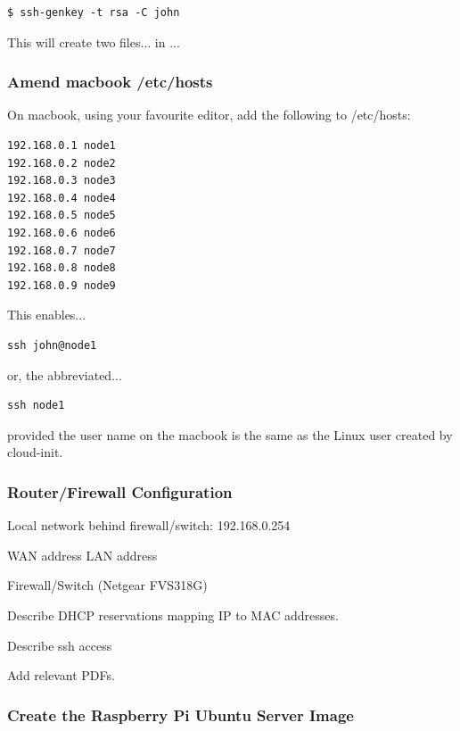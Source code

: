 \documentclass{article}
\begin{document}
\begin{lstlisting}[]
$ ssh-genkey -t rsa -C john
\end{lstlisting}

This will create two files... in ...



\subsubsection{Amend macbook /etc/hosts}

On macbook, using your favourite editor, add the following to /etc/hosts:

\begin{lstlisting}[]
192.168.0.1 node1
192.168.0.2 node2
192.168.0.3 node3
192.168.0.4 node4
192.168.0.5 node5
192.168.0.6 node6
192.168.0.7 node7
192.168.0.8 node8
192.168.0.9 node9
\end{lstlisting}

This enables...

\begin{lstlisting}[]
ssh john@node1
\end{lstlisting}

or, the abbreviated...

\begin{lstlisting}[]
ssh node1
\end{lstlisting}

provided the user name on the macbook is the same as the Linux user created by cloud-init.



\subsubsection{Router/Firewall Configuration}

Local network behind firewall/switch: 192.168.0.254

WAN address
LAN address

Firewall/Switch (Netgear FVS318G)

Describe DHCP reservations mapping IP to MAC addresses.

Describe ssh access

Add relevant PDFs.


\subsubsection{Create the Raspberry Pi Ubuntu Server Image}
\end{document}
